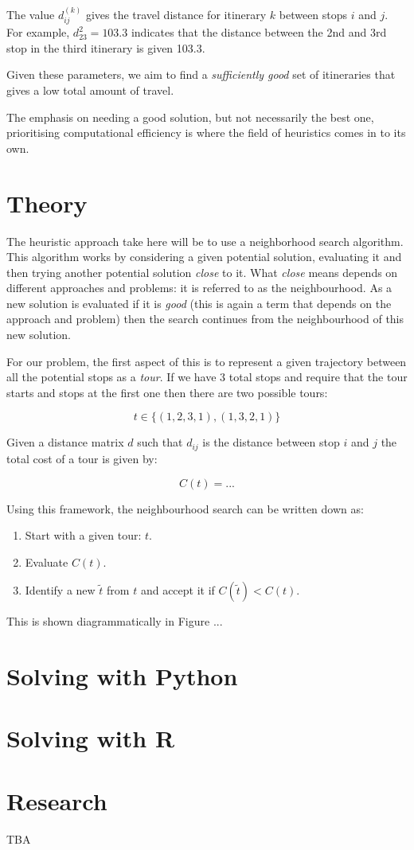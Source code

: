 The value \(d^{(k)}_{ij}\) gives the travel distance for itinerary \(k\) between
stops \(i\) and \(j\). For example, \(d^{2}_{23}=103.3\) %
indicates that the distance between the 2nd and 3rd stop in the third itinerary
is given 103.3. %

Given these parameters, we aim to find a \emph{sufficiently good} set of
itineraries that gives a low total amount of travel.

The emphasis on needing a good solution, but not necessarily the best one,
prioritising computational efficiency is where the field of heuristics comes in
to its own.

\section{Theory}\label{sec:theory}

The heuristic approach take here will be to use a neighborhood search algorithm.
This algorithm works by considering a given potential solution, evaluating it
and then trying another potential solution \emph{close} to it. What \emph{close}
means depends on different approaches and problems: it is referred to as the
neighbourhood. As a new solution is evaluated if it is \emph{good} (this is
again a term that depends on the approach and problem) then the search
continues from the neighbourhood of this new solution.

For our problem,
the first aspect of this is to represent a given trajectory between all the
potential stops as a \emph{tour}. If we have 3 total stops and require that the
tour starts and stops at the first one then there are two possible tours:

\[
    t \in \{(1, 2, 3, 1), (1, 3, 2, 1)\}
\]

Given a distance matrix \(d\) such that \(d_{ij}\) is the distance between stop
\(i\) and \(j\) the total cost of a tour is given by:

\[
    C(t)=...  %
\]


Using this framework, the neighbourhood search can be written down as:

\begin{enumerate}
    \item Start with a given tour: \(t\).
    \item Evaluate \(C(t)\).
    \item Identify a new \(\tilde t\) from \(t\) and accept it if \(C(\tilde t)<
        C(t)\).
\end{enumerate}

This is shown diagrammatically in Figure ... %
\section{Solving with Python}\label{sec:solving-with-python}

\section{Solving with R}\label{sec:solving-with-R}

\section{Research}\label{sec:research}

TBA

